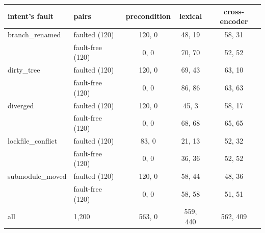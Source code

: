 \begin{tabular}{llccc}
\toprule
intent's fault & pairs & precondition & lexical & cross-encoder \\
\midrule
branch\_renamed & faulted (120) & 120, 0 & 48, 19 & 58, 31 \\
 & fault-free (120) & 0, 0 & 70, 70 & 52, 52 \\
dirty\_tree & faulted (120) & 120, 0 & 69, 43 & 63, 10 \\
 & fault-free (120) & 0, 0 & 86, 86 & 63, 63 \\
diverged & faulted (120) & 120, 0 & 45, 3 & 58, 17 \\
 & fault-free (120) & 0, 0 & 68, 68 & 65, 65 \\
lockfile\_conflict & faulted (120) & 83, 0 & 21, 13 & 52, 32 \\
 & fault-free (120) & 0, 0 & 36, 36 & 52, 52 \\
submodule\_moved & faulted (120) & 120, 0 & 58, 44 & 48, 36 \\
 & fault-free (120) & 0, 0 & 58, 58 & 51, 51 \\
\midrule
all & 1{,}200 & 563, 0 & 559, 440 & 562, 409 \\
\bottomrule
\end{tabular}
